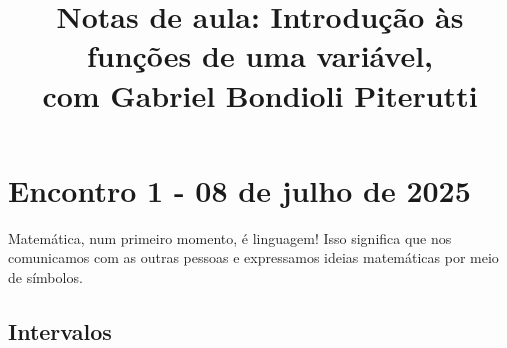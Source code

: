 \documentclass[12pt,openright,twoside,a4paper]{article}
\title{Notas de aula: Introdução às funções de uma variável, \\ \large com Gabriel Bondioli Piterutti}
\date{\vspace{-5ex}}
\theoremstyle{definition}
\begin{document}
	\nocite{*}
	\maketitle
	\tableofcontents
	\newpage
	
	\section{Encontro 1 - 08 de julho de 2025}
	
	Matemática, num primeiro momento, é linguagem! Isso significa que nos comunicamos com as outras pessoas e expressamos ideias matemáticas por meio de símbolos.
	
	\subsection{Intervalos}
	
\end{document}
